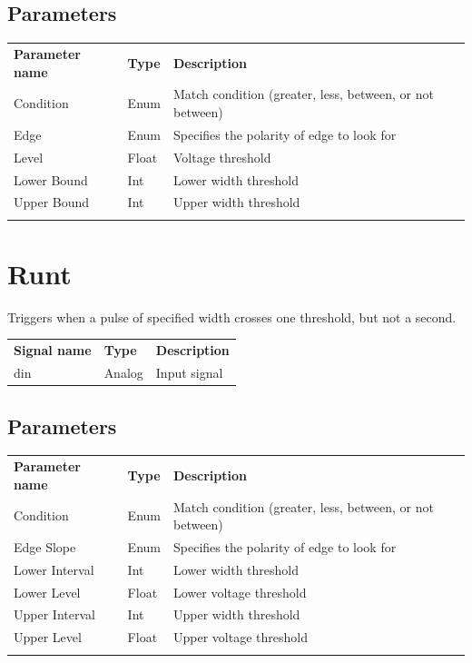 \subsection{Parameters}

\begin{tabularx}{16cm}{llX}
\thickhline
\textbf{Parameter name} & \textbf{Type} & \textbf{Description} \\
\thickhline
Condition & Enum & Match condition (greater, less, between, or not between) \\
\thickhline
Edge & Enum & Specifies the polarity of edge to look for\\
\thickhline
Level & Float & Voltage threshold\\
\thickhline
Lower Bound & Int & Lower width threshold\\
\thickhline
Upper Bound & Int & Upper width threshold\\
\thickhline
\end{tabularx}

\section{Runt}

Triggers when a pulse of specified width crosses one threshold, but not a second.

\begin{tabularx}{16cm}{llX}
\thickhline
\textbf{Signal name} & \textbf{Type} & \textbf{Description} \\
\thickhline
din & Analog & Input signal \\
\end{tabularx}

\subsection{Parameters}

\begin{tabularx}{16cm}{llX}
\thickhline
\textbf{Parameter name} & \textbf{Type} & \textbf{Description} \\
\thickhline
Condition & Enum & Match condition (greater, less, between, or not between) \\
\thickhline
Edge Slope & Enum & Specifies the polarity of edge to look for\\
\thickhline
Lower Interval & Int & Lower width threshold\\
\thickhline
Lower Level & Float & Lower voltage threshold\\
\thickhline
Upper Interval & Int & Upper width threshold\\
\thickhline
Upper Level & Float & Upper voltage threshold\\
\thickhline
\end{tabularx}

